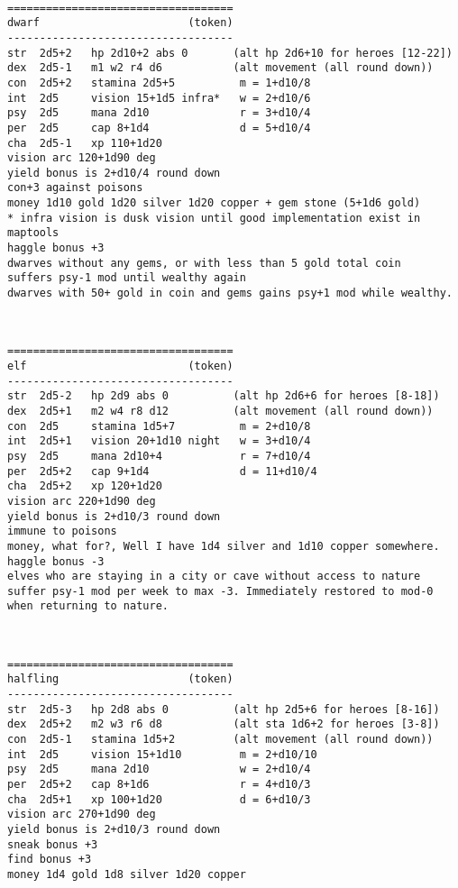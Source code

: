 \

\pagebreak[1] \begin{samepage} \begin{verbatim}
===================================
dwarf                       (token)
-----------------------------------
str  2d5+2   hp 2d10+2 abs 0       (alt hp 2d6+10 for heroes [12-22])
dex  2d5-1   m1 w2 r4 d6           (alt movement (all round down))
con  2d5+2   stamina 2d5+5          m = 1+d10/8
int  2d5     vision 15+1d5 infra*   w = 2+d10/6
psy  2d5     mana 2d10              r = 3+d10/4
per  2d5     cap 8+1d4              d = 5+d10/4
cha  2d5-1   xp 110+1d20
vision arc 120+1d90 deg
yield bonus is 2+d10/4 round down
con+3 against poisons
money 1d10 gold 1d20 silver 1d20 copper + gem stone (5+1d6 gold)
* infra vision is dusk vision until good implementation exist in maptools
haggle bonus +3
dwarves without any gems, or with less than 5 gold total coin
suffers psy-1 mod until wealthy again
dwarves with 50+ gold in coin and gems gains psy+1 mod while wealthy.
\end{verbatim} \end{samepage}

\

\pagebreak[1] \begin{samepage} \begin{verbatim}
===================================
elf                         (token)
-----------------------------------
str  2d5-2   hp 2d9 abs 0          (alt hp 2d6+6 for heroes [8-18])
dex  2d5+1   m2 w4 r8 d12          (alt movement (all round down))
con  2d5     stamina 1d5+7          m = 2+d10/8
int  2d5+1   vision 20+1d10 night   w = 3+d10/4
psy  2d5     mana 2d10+4            r = 7+d10/4
per  2d5+2   cap 9+1d4              d = 11+d10/4
cha  2d5+2   xp 120+1d20
vision arc 220+1d90 deg
yield bonus is 2+d10/3 round down
immune to poisons
money, what for?, Well I have 1d4 silver and 1d10 copper somewhere.
haggle bonus -3
elves who are staying in a city or cave without access to nature
suffer psy-1 mod per week to max -3. Immediately restored to mod-0
when returning to nature.
\end{verbatim} \end{samepage}

\

\pagebreak[1] \begin{samepage} \begin{verbatim}
===================================
halfling                    (token)
-----------------------------------
str  2d5-3   hp 2d8 abs 0          (alt hp 2d5+6 for heroes [8-16])
dex  2d5+2   m2 w3 r6 d8           (alt sta 1d6+2 for heroes [3-8])
con  2d5-1   stamina 1d5+2         (alt movement (all round down))
int  2d5     vision 15+1d10         m = 2+d10/10
psy  2d5     mana 2d10              w = 2+d10/4
per  2d5+2   cap 8+1d6              r = 4+d10/3
cha  2d5+1   xp 100+1d20            d = 6+d10/3
vision arc 270+1d90 deg
yield bonus is 2+d10/3 round down
sneak bonus +3
find bonus +3
money 1d4 gold 1d8 silver 1d20 copper
\end{verbatim} \end{samepage}

